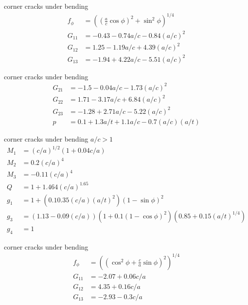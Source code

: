\documentclass[
  letterpaper,
  ignorenonframetext,
  aspectratio=43,
  handout,
  12pt]{beamer}
\begin{document}
\begin{frame}{corner cracks under bending}
\protect\hypertarget{corner-cracks-under-bending-3}{}
\[\begin{aligned}
  f_\phi &= \left(\left(\frac{a}{c}\cos \phi\right)^2 + \sin^2 \phi \right)^{1/4}\\
  G_{11} &= -0.43 - 0.74 a/c - 0.84 (a/c)^2\\
  G_{12} &= 1.25 - 1.19 a/c + 4.39 (a/c)^2\\
  G_{13} &= -1.94 + 4.22 a/c - 5.51 (a/c)^2
\end{aligned}\]
\end{frame}

\begin{frame}{corner cracks under bending}
\protect\hypertarget{corner-cracks-under-bending-4}{}
\[\begin{aligned}
  G_{21} &= -1.5 - 0.04 a/c - 1.73 (a/c)^2\\
  G_{22} &= 1.71 - 3.17 a/c + 6.84 (a/c)^2\\
  G_{23} &= -1.28 + 2.71 a/c - 5.22 (a/c)^2\\
  p &= 0.1 + 1.3 a/t + 1.1 a/c - 0.7 (a/c) (a/t)
\end{aligned}\]
\end{frame}

\begin{frame}{corner cracks under bending \(a/c > 1\)}
\protect\hypertarget{corner-cracks-under-bending-ac-1}{}
\[\begin{aligned}
  M_1 &= (c/a)^{1/2}(1+0.04 c/a)\\
  M_2 &= 0.2 (c/a)^4\\
  M_3 &= -0.11 (c/a)^4\\
  Q &= 1+ 1.464(c/a)^{1.65}\\
  g_1 &= 1 + \left(0.1 0.35(c/a)(a/t)^2\right)\left(1-\sin \phi\right)^2\\
  g_3 &= \left(1.13 - 0.09(c/a)\right)\left(1+ 0.1(1-\cos \phi)^2\right)\left(0.85 + 0.15(a/t)^{1/4}\right)\\
  g_4 &= 1
\end{aligned}\]
\end{frame}

\begin{frame}{corner cracks under bending}
\protect\hypertarget{corner-cracks-under-bending-5}{}
\[\begin{aligned}
  f_\phi &= \left(\left(\cos^2 \phi + \frac{c}{a}\sin \phi\right)^2  \right)^{1/4}\\
  G_{11} &= -2.07 + 0.06 c/a\\
  G_{12} &= 4.35 + 0.16 c/a\\
  G_{13} &= -2.93 - 0.3c/a
\end{aligned}\]
\end{frame}
\end{document}
